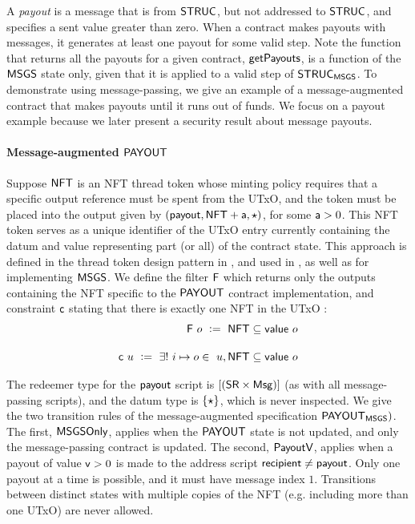 A \emph{payout} is a message that is from $\mathsf{STRUC}$, but not addressed to $\mathsf{STRUC}$, and
specifies a sent value greater than zero. When a contract makes payouts with messages,
it generates at least one payout for some valid step. Note the function that
returns all the payouts for a given contract, $\mathsf{getPayouts}$, is a function
of the $\mathsf{MSGS}$ state only, given that it is applied to a valid step of $\mathsf{STRUC}_{\mathsf{MSGS}}$.
To demonstrate using message-passing, we give an example of a message-augmented
contract that makes payouts until it runs out of funds. We focus on a payout
example because we later present a security result about message payouts.

\paragraph{Message-augmented $\mathsf{PAYOUT}$}

Suppose $\mathsf{NFT}$ is an NFT thread
token whose minting policy requires that a specific output reference must be
spent from the UTxO, and the token must be placed into the output given by
$(\mathsf{payout}, \mathsf{NFT} + \mathsf{a}, \star)$, for some $\mathsf{a} > 0$.
This NFT token serves as a unique identifier of the UTxO entry currently containing the datum and value
representing part (or all) of the contract state.
This approach is defined in the thread token
design pattern in \cite{eutxoma}, and used in \cite{structured}, as well
as for implementing $\mathsf{MSGS}$.
We define the filter $\mathsf{F}$ which returns only the outputs containing
the NFT specific to the $\mathsf{PAYOUT}$ contract implementation,
and constraint $\mathsf{c}$ stating that there is exactly one NFT in the UTxO :
\begin{align*}
  \fun{F}~o~ \leteq~\fun{NFT} \subseteq \val~o
  \nextdef
  \fun{c}~u~\leteq~\exists!~i\mapsto o \in~u, \fun{NFT} \subseteq \val~o
\end{align*}

The redeemer type for the $\mathsf{payout}$ script is $[(\mathsf{SR} \times \mathsf{Msg})]$ (as
with all message-passing scripts), and
the datum type is $\{\star\}$, which is never inspected.
We give the two transition rules of the message-augmented specification $\mathsf{PAYOUT}_{\mathsf{MSGS}})$.
The first, $\mathsf{MSGSOnly}$, applies when the $\mathsf{PAYOUT}$ state is not updated,
and only the message-passing contract is updated. The second, $\mathsf{PayoutV}$,
applies when a payout of value $\mathsf{v} > 0$ is made to the address script
$\mathsf{recipient} \neq \mathsf{payout}$. Only one payout at a time is possible,
and it must have message index $1$.
Transitions between distinct states with multiple copies of the NFT (e.g.
including more than one UTxO) are never allowed.

